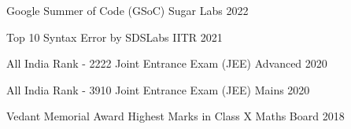 


\begin{cvhonors}


\cvhonor
{Google Summer of Code (GSoC)} %
{Sugar Labs}  %
{} %
{2022} %

  \cvhonor
{Top 10} %
{Syntax Error by SDSLabs IITR}  %
{} %
{2021} %

  \cvhonor
{All India Rank - 2222} %
{Joint Entrance Exam (JEE) Advanced }  %
{} %
{2020} %

  \cvhonor
{All India Rank - 3910} %
{Joint Entrance Exam (JEE) Mains }  %
{} %
{2020} %


  \cvhonor
{Vedant Memorial Award} %
{Highest Marks in Class X Maths Board}  %
{} %
{2018} %






	


\end{cvhonors}

